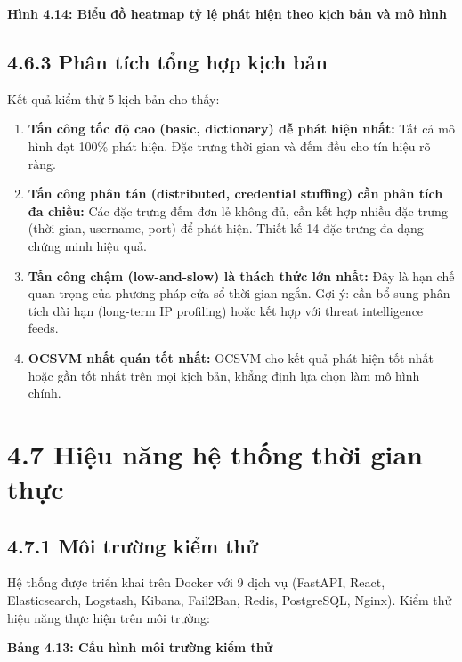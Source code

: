 \documentclass[
  a4paper]{report}
\begin{document}
\textbf{Hình 4.14: Biểu đồ heatmap tỷ lệ phát hiện theo kịch bản và mô
hình}

\subsection{4.6.3 Phân tích tổng hợp kịch
bản}\label{phuxe2n-tuxedch-tux1ed5ng-hux1ee3p-kux1ecbch-bux1ea3n}

Kết quả kiểm thử 5 kịch bản cho thấy:

\begin{enumerate}
\def\labelenumi{\arabic{enumi}.}
\item
  \textbf{Tấn công tốc độ cao (basic, dictionary) dễ phát hiện nhất:}
  Tất cả mô hình đạt 100\% phát hiện. Đặc trưng thời gian và đếm đều cho
  tín hiệu rõ ràng.
\item
  \textbf{Tấn công phân tán (distributed, credential stuffing) cần phân
  tích đa chiều:} Các đặc trưng đếm đơn lẻ không đủ, cần kết hợp nhiều
  đặc trưng (thời gian, username, port) để phát hiện. Thiết kế 14 đặc
  trưng đa dạng chứng minh hiệu quả.
\item
  \textbf{Tấn công chậm (low-and-slow) là thách thức lớn nhất:} Đây là
  hạn chế quan trọng của phương pháp cửa sổ thời gian ngắn. Gợi ý: cần
  bổ sung phân tích dài hạn (long-term IP profiling) hoặc kết hợp với
  threat intelligence feeds.
\item
  \textbf{OCSVM nhất quán tốt nhất:} OCSVM cho kết quả phát hiện tốt
  nhất hoặc gần tốt nhất trên mọi kịch bản, khẳng định lựa chọn làm mô
  hình chính.
\end{enumerate}

\section{4.7 Hiệu năng hệ thống thời gian
thực}\label{hiux1ec7u-nux103ng-hux1ec7-thux1ed1ng-thux1eddi-gian-thux1ef1c}

\subsection{4.7.1 Môi trường kiểm
thử}\label{muxf4i-trux1b0ux1eddng-kiux1ec3m-thux1eed}

Hệ thống được triển khai trên Docker với 9 dịch vụ (FastAPI, React,
Elasticsearch, Logstash, Kibana, Fail2Ban, Redis, PostgreSQL, Nginx).
Kiểm thử hiệu năng thực hiện trên môi trường:

\textbf{Bảng 4.13: Cấu hình môi trường kiểm thử}
\end{document}
